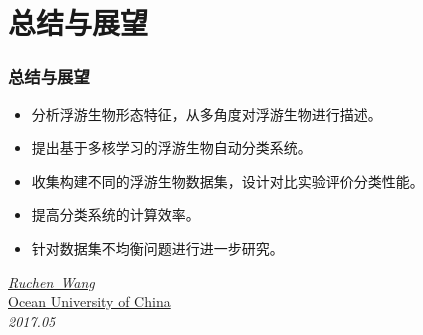 \documentclass[notheorems,mathserif,table,compress]{beamer}  %
\begin{document}

\section{总结与展望}

\begin{frame}
\frametitle{总结与展望}
\begin{tcolorbox}[colback=red!5,colframe=blue!75!black]
\begin{itemize}
\item 分析浮游生物形态特征，从多角度对浮游生物进行描述。
\item 提出基于多核学习的浮游生物自动分类系统。
\item 收集构建不同的浮游生物数据集，设计对比实验评价分类性能。
\end{itemize}
\end{tcolorbox}
\begin{tcolorbox}[colback=red!5,colframe=blue!75!black]
\begin{itemize}
\item 提高分类系统的计算效率。
\item 针对数据集不均衡问题进行进一步研究。
\end{itemize}
\end{tcolorbox}
\end{frame}

\begin{frame}
\vspace{2cm}

\vspace{1.5cm}

\begin{flushright}
\emph{\href{mailto:wangruchen514@163.com}{\textrm {Ruchen~Wang}}}\\
\href{http://www.ouc.edu.cn}{\textrm {Ocean University of China}}\\
\emph{\textrm {2017.05}}
\end{flushright}  
\end{frame}
\end{document}
